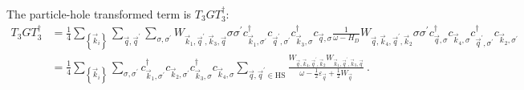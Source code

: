 \documentclass{revtex4-2}
\begin{document}
The particle-hole transformed term is \(T_3 G T_3^\dagger\):
\begin{equation}\begin{aligned}
	T_3 G T_3^\dagger &= \frac{1}{4}\sum_{\left\{ \vec k_i \right\} }\sum_{\vec q,\vec q^\prime}\sum_{\sigma,\sigma^\prime} W_{\vec k_1,\vec q^\prime, \vec k_3, \vec q} \sigma\sigma^\prime c^\dagger_{\vec k_1,\sigma^\prime} c_{\vec q^\prime,\sigma^\prime} c^\dagger_{\vec k_3,\sigma} c_{\vec q,\sigma} \frac{1}{\omega - H_D} W_{\vec q,\vec k_4, \vec q^\prime, \vec k_2} \sigma\sigma^\prime c^\dagger_{\vec q,\sigma}c_{\vec k_4,\sigma}c^\dagger_{\vec q^\prime,\sigma^\prime}c_{\vec k_2,\sigma^\prime}\\
			  &= \frac{1}{4}\sum_{\left\{ \vec k_i \right\}}\sum_{\sigma,\sigma^\prime} c^\dagger_{\vec k_1,\sigma^\prime} c_{\vec k_2,\sigma^\prime} c^\dagger_{\vec k_3,\sigma}c_{\vec k_4,\sigma} \sum_{\vec q, \vec q^\prime \in \text{HS}}\frac{W_{\vec q,\vec k_4, \vec q^\prime, \vec k_2} W_{\vec k_1,\vec q^\prime, \vec k_3, \vec q}}{\omega - \frac{1}{2}\varepsilon_{\vec q} + \frac{1}{2}W_{\vec q}}~.
\end{aligned}\end{equation}
\end{document}
